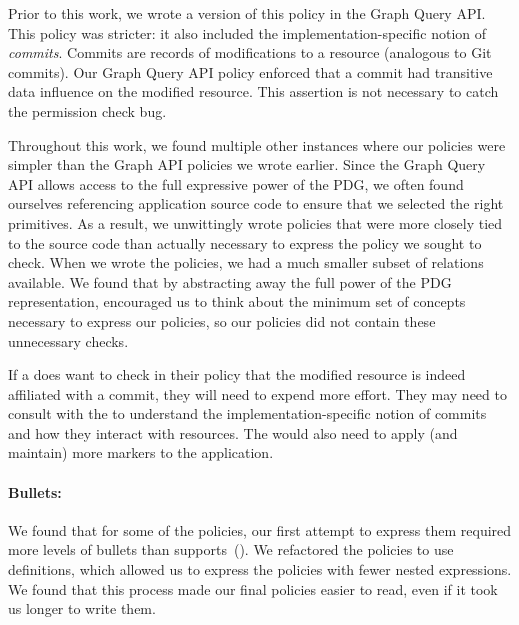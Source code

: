 Prior to this work, we wrote a version of this policy in the Graph Query API.
%
This policy was stricter: it also included the implementation-specific notion of \emph{commits}.
%
Commits are records of modifications to a resource (analogous to Git commits).
%
Our Graph Query API policy enforced that a commit had transitive data influence on the modified resource.
%
This assertion is not necessary to catch the permission check bug.
%

Throughout this work, we found multiple other instances where our \syslang{}
policies were simpler than the Graph API policies we wrote earlier.
%
Since the Graph Query API allows \devs{} access to the full expressive power of the PDG,
we often found ourselves referencing application source code to ensure that we selected the right primitives.
%
As a result, we unwittingly wrote policies that were more closely tied to the 
source code than actually necessary to express the policy we sought to check.
%
When we wrote the \syslang{} policies, 
we had a much smaller subset of relations available.
%
We found that by abstracting away the full power of the PDG representation,
\syslang{} encouraged us to think about the minimum set of concepts
necessary to express our policies,
so our policies did not contain these unnecessary checks.

If a \ce{} does want to check in their \syslang{} policy that the modified resource is indeed
affiliated with a commit, they will need to expend more effort.
%
%
%
They may need to consult with the \dev{} to understand 
the implementation-specific notion of commits and how they interact with resources.
%
The \dev{} would also need to apply (and maintain) more markers to the application.

\paragraph{Bullets:} We found that for some of the policies, 
our first attempt to express them required more levels of bullets than \sys{} supports~().
%
We refactored the policies to use definitions, 
which allowed us to express the policies with fewer nested expressions.
%
We found that this process made our final policies easier to read,
even if it took us longer to write them.